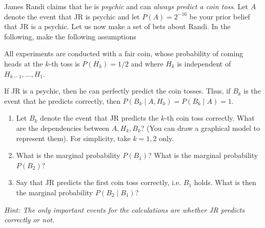 \documentclass[twoside,a4paper]{article}
\begin{document}
\begin{exercise}
  James Randi claims that he is \emph{psychic} and can \emph{always predict a coin toss}. Let $A$ denote the event that JR is psychic and let $P(A) = 2^{-16}$ be your prior belief that JR is a psychic. Let us now make a set of bets about Randi.
  In the following, make the following assumptions
  \begin{assumption}
    All experiments are conducted with a fair coin, whose probability of coming heads at the $k$-th toss is $P(H_k) = 1/2$ and where $H_k$ is independent of $H_{k-1}, \ldots, H_1$.
  \end{assumption}
  \begin{assumption}
    If JR is a psychic, then he can perfectly predict the coin tosses. Thus, if $B_k$ is the event that he predicts correctly, then $P(B_k \mid A, H_k) = P(B_k \mid A) = 1$.
  \end{assumption}


  
  \begin{enumerate}
  \item Let $B_k$ denote the event that JR predicts the $k$-th coin toss correctly. What are the dependencies between $A, H_k, B_k$? (You can draw a graphical model to represent them). For simplicity, take $k=1, 2$ only.
  \item What is the marginal probability $P(B_1)$? What is the marginal probability $P(B_2)$?  
  \item Say that JR predicts the first coin toss correctly, i.e. $B_1$ holds. What is then the marginal probability $P(B_2 \mid B_1)$? 
  \end{enumerate}
  \emph{Hint: The only important events for the calculations are whether JR predicts correctly or not.}
\end{exercise}
\end{document}
